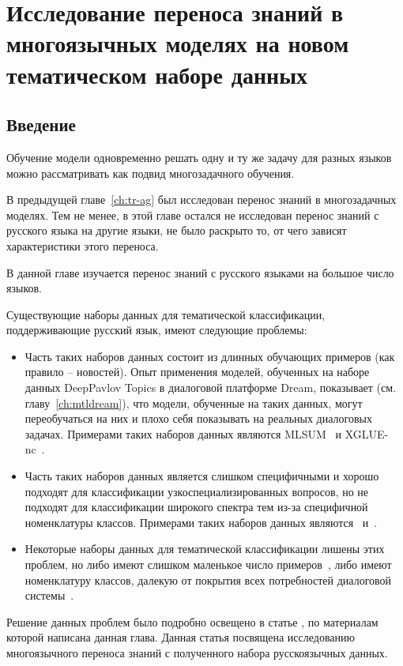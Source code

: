 \chapter{Исследование переноса знаний в многоязычных моделях на новом тематическом наборе данных}\label{ch:rutopics}
\section{Введение}
Обучение модели одновременно решать одну и ту же задачу для разных языков можно рассматривать как подвид многозадачного обучения.

В предыдущей главе~\ref{ch:tr-ag} был исследован перенос знаний в многозадачных моделях. Тем не менее, в этой главе остался не исследован перенос знаний с русского языка на другие языки, не было раскрыто то, от чего зависят характеристики этого переноса. 

В данной главе изучается перенос знаний с русского языками на большое число языков. 


Существующие наборы данных для тематической классификации, поддерживающие русский язык, имеют следующие проблемы:
\begin{itemize}
   \item Часть таких наборов данных состоит из длинных обучающих примеров (как правило -- новостей). Опыт применения моделей, обученных на наборе данных {DeepPavlov Topics} в диалоговой платформе Dream, показывает (см. главу~\ref{ch:mtldream}), что модели, обученные на таких данных, могут переобучаться на них и плохо себя показывать на реальных диалоговых задачах. Примерами таких наборов данных являются {MLSUM}~\cite{mlsum} и {XGLUE-nc}~\cite{xglue}.
   \item Часть таких наборов данных является слишком специфичными и хорошо подходят для классификации узкоспециализированных вопросов, но не подходят для классификации широкого спектра тем из-за специфичной номенклатуры классов.  Примерами таких наборов данных являются~\cite{healthcare_facilities_reviews} и~\cite{pstu}.
   \item Некоторые наборы данных для тематической классификации лишены этих проблем, но либо имеют слишком маленькое число примеров~\cite{chatbotru}, либо имеют номенклатуру классов, далекую от покрытия всех потребностей диалоговой системы~\cite{massive}.
\end{itemize}
Решение данных проблем было подробно освещено в статье \cite{rutopics}, по материалам которой написана данная глава. Данная статья посвящена исследованию многоязычного переноса знаний с полученного набора русскоязычных данных.

